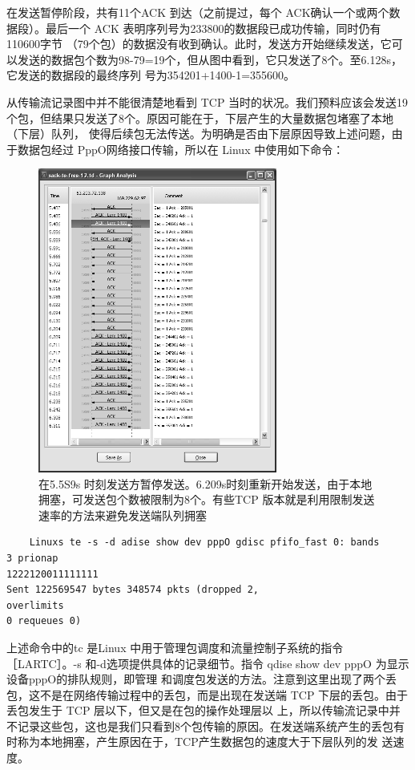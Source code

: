 在发送暂停阶段，共有11个ACK 到达（之前提过，每个 ACK确认一个或两个数据段）。最后一个 ACK 表明序列号为233800的数据段已成功传输，同时仍有110600字节
（79个包）的数据没有收到确认。此时，发送方开始继续发送，它可以发送的数据包个数为98-79=19个，但从图中看到，它只发送了8个。至6.128s，它发送的数据段的最终序列
号为354201+1400-1=355600。

从传输流记录图中并不能很清楚地看到 TCP 当时的状况。我们预料应该会发送19个包，但结果只发送了8个。原因可能在于，下层产生的大量数据包堵塞了本地（下层）队列，
使得后续包无法传送。为明确是否由下层原因导致上述问题，由于数据包经过 PppO网络接口传输，所以在 Linux 中使用如下命令：
\begin{figure}[!htb]
    \centering
	\includegraphics[width=0.7\textwidth]{imgs/16/16-7.png}
	\caption{在5.5S9s 时刻发送方暂停发送。6.209s时刻重新开始发送，由于本地拥塞，可发送包个数被限制为8个。有些TCP 版本就是利用限制发送速率的方法来避免发送端队列拥塞}
\end{figure}

\begin{verbatim}
    Linuxs te -s -d adise show dev pppO gdisc pfifo_fast 0: bands
3 prionap
1222120011111111
Sent 122569547 bytes 348574 pkts (dropped 2,
overlimits
0 requeues 0)
\end{verbatim}

上述命令中的tc 是Linux 中用于管理包调度和流量控制子系统的指令［LARTC］。-s 和-d选项提供具体的记录细节。指令 qdise show dev pppO 为显示设备pppO的排队规则，即管理
和调度包发送的方法。注意到这里出现了两个丢包，这不是在网络传输过程中的丢包，而是出现在发送端 TCP 下层的丢包。由于丢包发生于 TCP 层以下，但又是在包的操作处理层以
上，所以传输流记录中并不记录这些包，这也是我们只看到8个包传输的原因。在发送端系统产生的丢包有时称为本地拥塞，产生原因在于，TCP产生数据包的速度大于下层队列的发
送速度。

